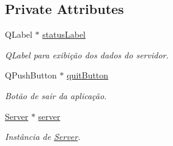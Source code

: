 \subsection*{Private Attributes}
\begin{DoxyCompactItemize}
\item 
Q\+Label $\ast$ \hyperlink{classServerDialogImpl_a939de93eb188fe551041eb94531072af}{status\+Label}\hypertarget{classServerDialogImpl_a939de93eb188fe551041eb94531072af}{}\label{classServerDialogImpl_a939de93eb188fe551041eb94531072af}

\begin{DoxyCompactList}\small\item\em Q\+Label para exibição dos dados do servidor. \end{DoxyCompactList}\item 
Q\+Push\+Button $\ast$ \hyperlink{classServerDialogImpl_a620d45dc0aca6115b54502cf4939fa60}{quit\+Button}\hypertarget{classServerDialogImpl_a620d45dc0aca6115b54502cf4939fa60}{}\label{classServerDialogImpl_a620d45dc0aca6115b54502cf4939fa60}

\begin{DoxyCompactList}\small\item\em Botão de sair da aplicação. \end{DoxyCompactList}\item 
\hyperlink{classServer}{Server} $\ast$ \hyperlink{classServerDialogImpl_ad69d13de3b1f89c826bb5a5c82ee91fb}{server}\hypertarget{classServerDialogImpl_ad69d13de3b1f89c826bb5a5c82ee91fb}{}\label{classServerDialogImpl_ad69d13de3b1f89c826bb5a5c82ee91fb}

\begin{DoxyCompactList}\small\item\em Instância de \hyperlink{classServer}{Server}. \end{DoxyCompactList}\end{DoxyCompactItemize}
